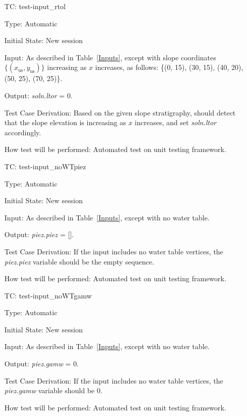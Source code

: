 \documentclass[12pt, titlepage]{article}
\newcounter{utestnum} %
\begin{document}
\begin{enumerate}[label=TC\arabic*:,ref={\arabic*}]

\item [TC\refstepcounter{utestnum}\theutestnum: \label{TC_InputRtoL}] 
test-input\_rtol

Type: Automatic
					
Initial State: New session
					
Input: As described in Table~\ref{Inputs}, except with slope coordinates 
$\{\left(x_\text{us},y_\text{us}\right)\}$ increasing as $x$ increases, as 
follows: \{(0, 
15), (30, 15), (40, 20), (50, 25), (70, 25)\}.
					
Output: \textit{soln.ltor} = 0.

Test Case Derivation: Based on the given slope stratigraphy, \progname{} should 
detect that the slope elevation is increasing as $x$ increases, and set 
\textit{soln.ltor} accordingly.

How test will be performed: Automated test on unit testing framework.
					
\item [TC\refstepcounter{utestnum}\theutestnum: \label{TC_InputNoWTpiez}] 
test-input\_noWTpiez

Type: Automatic

Initial State: New session

Input: As described in Table~\ref{Inputs}, except with no water table.

Output: \textit{piez.piez} = [].

Test Case Derivation: If the input includes no water table vertices, the 
\textit{piez.piez} variable should be the empty sequence.

How test will be performed: Automated test on unit testing framework.

\item [TC\refstepcounter{utestnum}\theutestnum: \label{TC_InputNoWTgamw}] 
test-input\_noWTgamw

Type: Automatic

Initial State: New session

Input: As described in Table~\ref{Inputs}, except with no water table.

Output: \textit{piez.gamw} = 0.

Test Case Derivation: If the input includes no water table vertices, the 
\textit{piez.gamw} variable should be 0.

How test will be performed: Automated test on unit testing framework.
    
\end{enumerate}
\end{document}
